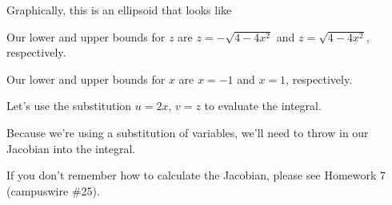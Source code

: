 \documentclass{article}
\begin{document}
Graphically, this is an ellipsoid that looks like
\begin{center}
\end{center}
Our lower and upper bounds for $z$ are $z=-\sqrt{4-4x^2}$ and $z=\sqrt{4-4x^2}$, respectively.

Our lower and upper bounds for $x$ are $x=-1$ and $x=1$, respectively.

Let's use the substitution $u=2x$, $v=z$ to evaluate the integral. 

Because we're using a substitution of variables, we'll need to throw in our Jacobian into the integral.

If you don't remember how to calculate the Jacobian, please see Homework 7 (campuswire \#25).
\end{document}
